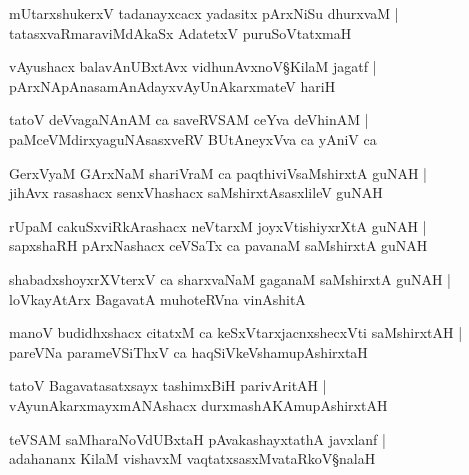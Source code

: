 \begin{shloka}
mUtarxshukerxV tadanayxcacx yadasitx pArxNiSu dhurxvaM |\\
tatasxvaRmaraviMdAkaSx AdatetxV puruSoVtatxmaH 
\end{shloka}

\begin{shloka}
vAyushacx balavAnUBxtAvx vidhunAvxnoV\S KilaM jagatf |\\
pArxNApAnasamAnAdayxvAyUnAkarxmateV hariH 
\end{shloka}

\begin{shloka}
tatoV deVvagaNAnAM ca saveRVSAM ceYva deVhinAM |\\
paMceVMdirxyaguNAsasxveRV BUtAneyxVva ca yAniV ca 
\end{shloka}

\begin{shloka}
GerxVyaM GArxNaM shariVraM ca paqthiviVsaMshirxtA guNAH |\\
jihAvx rasashacx senxVhashacx saMshirxtAsasxlileV guNAH 
\end{shloka}

\begin{shloka}
rUpaM cakuSxviRkArashacx neVtarxM joyxVtishiyxrXtA guNAH |\\
sapxshaRH pArxNashacx ceVSaTx ca pavanaM saMshirxtA guNAH 
\end{shloka}

\begin{shloka}
shabadxshoyxrXVterxV ca sharxvaNaM gaganaM saMshirxtA guNAH |\\
loVkayAtArx BagavatA muhoteRVna vinAshitA 
\end{shloka}

\begin{shloka}
manoV budidhxshacx citatxM ca keSxVtarxjacnxshecxVti saMshirxtAH |\\
pareVNa parameVSiThxV ca haqSiVkeVshamupAshirxtaH 
\end{shloka}

\begin{shloka}
tatoV Bagavatasatxsayx tashimxBiH parivAritAH |\\
vAyunAkarxmayxmANAshacx durxmashAKAmupAshirxtAH
\end{shloka}

\begin{shloka}
teVSAM saMharaNoVdUBxtaH pAvakashayxtathA javxlanf |\\
adahananx KilaM vishavxM vaqtatxsasxMvataRkoV\S nalaH 
\end{shloka}

